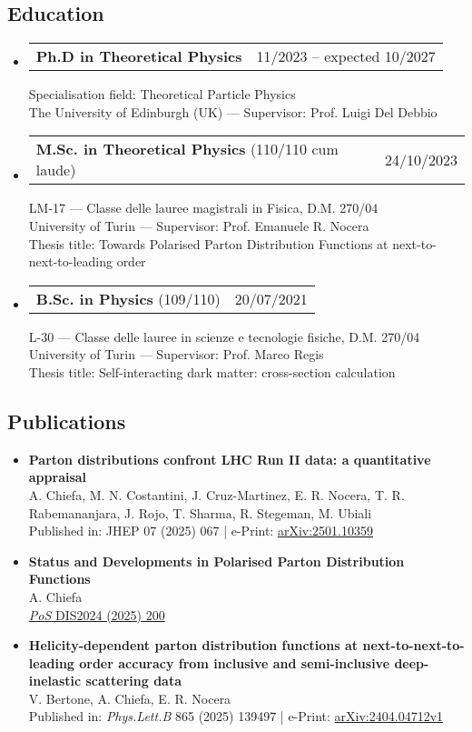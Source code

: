 \documentclass[10pt,a4paper]{article}
\makeatletter
\newcommand{\headerrow}[2]
{\begin{tabular*}{\linewidth}{l@{\extracolsep{\fill}}r}
	#1 &
	#2 \\
\end{tabular*}}
\makeatother
\begin{document}
\subsection*{Education}
\begin{itemize}[leftmargin=1em]
  \item[] 
  \headerrow
		{\textbf{Ph.D in Theoretical Physics}}
    {11/2023 – expected 10/2027}
    Specialisation field: Theoretical Particle Physics\\
    The University of Edinburgh (UK) — Supervisor: Prof. Luigi Del Debbio
  \item[]
  \headerrow
    {\textbf{M.Sc. in Theoretical Physics} (110/110 cum laude)}
    {24/10/2023}
    LM-17 — Classe delle lauree magistrali in Fisica, D.M. 270/04\\
    University of Turin — Supervisor: Prof. Emanuele R. Nocera\\
    Thesis title: Towards Polarised Parton Distribution Functions at next-to-next-to-leading order
  \item[]
  \headerrow
    {\textbf{B.Sc. in Physics} (109/110)}
    {20/07/2021}
    L-30 — Classe delle lauree in scienze e tecnologie fisiche, D.M. 270/04\\
    University of Turin — Supervisor: Prof. Marco Regis\\
    Thesis title: Self-interacting dark matter: cross-section calculation
\end{itemize}

\subsection*{Publications}
\begin{itemize}[leftmargin=1em]
    \item[] 
      \textbf{Parton distributions confront LHC Run II data: a quantitative appraisal} \\
      A. Chiefa, M. N. Costantini, J. Cruz-Martinez, E. R. Nocera, T. R. Rabemananjara, J. Rojo, T. Sharma, R. Stegeman, M. Ubiali \\
      Published in: JHEP 07 (2025) 067 | e-Print: \href{https://arxiv.org/abs/2501.10359}{arXiv:2501.10359}
    \item[] 
      \textbf{Status and Developments in Polarised Parton Distribution Functions} \\
      A. Chiefa\\
      \href{https://pos.sissa.it/469/200/pdf}{\textit{PoS} DIS2024 (2025) 200}
    \item[]
      \textbf{Helicity-dependent parton distribution functions at next-to-next-to-leading order accuracy from inclusive and semi-inclusive deep-inelastic scattering data} \\
      V. Bertone, A. Chiefa, E. R. Nocera \\
      Published in: {\it Phys.Lett.B} 865 (2025) 139497 | e-Print: \href{https://arxiv.org/pdf/2404.04712}{arXiv:2404.04712v1}
\end{itemize}
\end{document}
